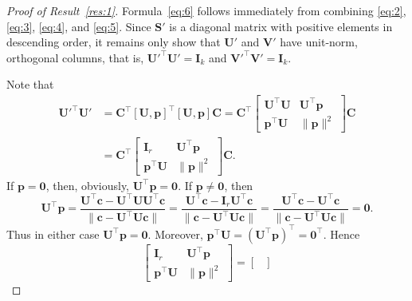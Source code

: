 \documentclass[11pt,a4paper]{article}
\theoremstyle{break}
\numberwithin{dummy}{section}
\theoremstyle{plain}
\theoremstyle{plain}
\theoremstyle{plain}
\theoremstyle{plain}
\theoremstyle{plain}
\theoremstyle{MyNonumberplain}
\newtheorem{proof}{Proof}
\newcommand{\0}{\M{0}}
\newcommand{\M}[1]{\mathbf{#1}}
\newcommand{\T}{\top}
\newcommand{\ve}[1]{\mathbf{#1}}
\begin{document}
\begin{proof}[Proof of Result~\ref{res:1}]
  Formula~\eqref{eq:6} follows immediately from combining \eqref{eq:2}, \eqref{eq:3}, \eqref{eq:4}, and \eqref{eq:5}.  Since $\M{S}'$ is a diagonal matrix with positive elements in descending order, it remains only show that $\M{U}'$ and $\M{V}' $ have unit-norm, orthogonal columns, that is,
  \begin{math}
    \M{U}'^\T \M{U}' = \M{I}_k
  \end{math}
  and
  \begin{math}
    \M{V}'^\T \M{V}' = \M{I}_k.
  \end{math}

  Note that
  \begin{equation}
    \label{eq:8}
    \begin{split}
      \M{U}'^\T \M{U}' & = \M{C}^\T [\M{U}, \ve{p}]^\T [\M{U}, \ve{p}] \M{C} = \M{C}^\T
      \begin{bmatrix}
        \M{U}^\T \M{U} & \M{U}^\T \ve{p} \\
        \ve{p}^\T \M{U} & \| \ve{p} \|^2
      \end{bmatrix}
      \M{C}
      \\
      & = \M{C}^\T
      \begin{bmatrix}
        \M{I}_r & \M{U}^\T \ve{p} \\
        \ve{p}^\T \M{U} & \| \ve{p} \|^2
      \end{bmatrix}
      \M{C}.
    \end{split}
  \end{equation}
  If $\ve{p} = \0$, then, obviously, $\M{U}^\T \ve{p} = \0$.  If $\ve{p} \neq \0$, then
  \begin{displaymath}
    \M{U}^\T \ve{p}
    =  \frac{\M{U}^\T \ve{c} - \M{U}^\T \M{U} \M{U}^\T \ve{c}}
    {\| \ve{c} - \M{U}^\T \M{U} \ve{c}\|}
    =
    \frac{\M{U}^\T \ve{c} - \M{I}_r \M{U}^\T \ve{c}}
    {\| \ve{c} - \M{U}^\T \M{U} \ve{c}\|}
    =
    \frac{\M{U}^\T \ve{c} - \M{U}^\T \ve{c}}
    {\| \ve{c} - \M{U}^\T \M{U} \ve{c}\|}
    =
    \0.
  \end{displaymath}
  Thus in either case $\M{U}^\T \ve{p} = \0$. Moreover, $\ve{p}^\T \M{U} = (\M{U}^\T \ve{p})^\T = \0^\T$. Hence
  \begin{displaymath}
    \begin{bmatrix}
      \M{I}_r & \M{U}^\T \ve{p} \\
      \ve{p}^\T \M{U} & \| \ve{p} \|^2
    \end{bmatrix}
    =
    \begin{bmatrix}

\end{bmatrix}
\end{displaymath}
\end{proof}
\end{document}
